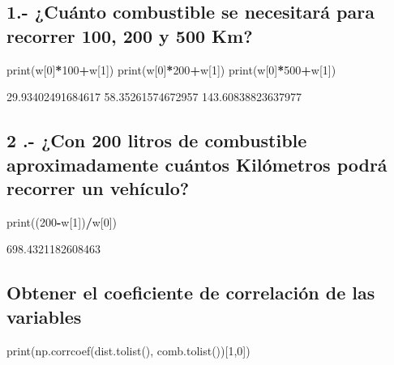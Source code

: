 \documentclass[]{article}
\newenvironment{Shaded}{\begin{snugshade}}{\end{snugshade}}
\newcommand{\DecValTok}[1]{\textcolor[rgb]{0.00,0.00,0.81}{#1}}
\newcommand{\OperatorTok}[1]{\textcolor[rgb]{0.81,0.36,0.00}{\textbf{#1}}}
\newcommand{\BuiltInTok}[1]{#1}
\newcommand{\NormalTok}[1]{#1}
\begin{document}
\subsection{1.- ¿Cuánto combustible se necesitará para recorrer 100, 200
y 500
Km?}\label{cuanto-combustible-se-necesitara-para-recorrer-100-200-y-500-km}

\begin{Shaded}
\begin{Highlighting}[]
\BuiltInTok{print}\NormalTok{(w[}\DecValTok{0}\NormalTok{]}\OperatorTok{*}\DecValTok{100}\OperatorTok{+}\NormalTok{w[}\DecValTok{1}\NormalTok{])}
\BuiltInTok{print}\NormalTok{(w[}\DecValTok{0}\NormalTok{]}\OperatorTok{*}\DecValTok{200}\OperatorTok{+}\NormalTok{w[}\DecValTok{1}\NormalTok{])}
\BuiltInTok{print}\NormalTok{(w[}\DecValTok{0}\NormalTok{]}\OperatorTok{*}\DecValTok{500}\OperatorTok{+}\NormalTok{w[}\DecValTok{1}\NormalTok{])}
\end{Highlighting}
\end{Shaded}

29.93402491684617 58.35261574672957 143.60838823637977

\subsection{2 .- ¿Con 200 litros de combustible aproximadamente cuántos
Kilómetros podrá recorrer un
vehículo?}\label{con-200-litros-de-combustible-aproximadamente-cuantos-kilometros-podra-recorrer-un-vehiculo}

\begin{Shaded}
\begin{Highlighting}[]
\BuiltInTok{print}\NormalTok{((}\DecValTok{200}\OperatorTok{-}\NormalTok{w[}\DecValTok{1}\NormalTok{])}\OperatorTok{/}\NormalTok{w[}\DecValTok{0}\NormalTok{])}
\end{Highlighting}
\end{Shaded}

698.4321182608463

\subsection{Obtener el coeficiente de correlación de las
variables}\label{obtener-el-coeficiente-de-correlacion-de-las-variables}

\begin{Shaded}
\begin{Highlighting}[]
\BuiltInTok{print}\NormalTok{(np.corrcoef(dist.tolist(), comb.tolist())[}\DecValTok{1}\NormalTok{,}\DecValTok{0}\NormalTok{])}
\end{Highlighting}
\end{Shaded}
\end{document}
